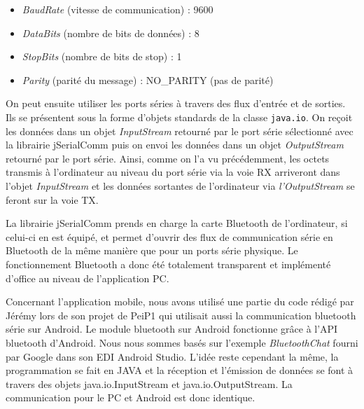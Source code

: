\documentclass{polytech/polytech}
\begin{document}

\begin{itemize}
\item \textit{BaudRate} (vitesse de communication) : 9600
\item \textit{DataBits} (nombre de bits de données) : 8
\item \textit{StopBits} (nombre de bits de stop) : 1
\item \textit{Parity} (parité du message) : NO\_PARITY (pas de parité)
\end{itemize}

On peut ensuite utiliser les ports séries à travers des flux d'entrée et de sorties. Ils se présentent sous la forme d'objets standards de la classe \texttt{java.io}. On reçoit les données dans un objet \textit{InputStream} retourné par le port série sélectionné avec la librairie jSerialComm puis on envoi les données dans un objet \textit{OutputStream} retourné par le port série. Ainsi, comme on l'a vu précédemment, les octets transmis à l'ordinateur au niveau du port série via la voie RX arriveront dans l'objet \textit{InputStream} et les données sortantes de l'ordinateur via \textit{l'OutputStream} se feront sur la voie TX.

La librairie jSerialComm prends en charge la carte Bluetooth de l'ordinateur, si celui-ci en est équipé, et permet d'ouvrir des flux de communication série en Bluetooth de la même manière que pour un ports série physique. Le fonctionnement Bluetooth a donc été totalement transparent et implémenté d'office au niveau de l'application PC.

Concernant l'application mobile, nous avons utilisé une partie du code rédigé par Jérémy lors de son projet de PeiP1 qui utilisait aussi la communication bluetooth série sur Android.
 Le module bluetooth sur Android fonctionne grâce à l'API bluetooth   d'Android. 
Nous nous sommes basés sur l'exemple \textit{BluetoothChat} fourni par Google dans son EDI Android Studio. L'idée reste cependant la même, la programmation se fait en JAVA et la réception et l'émission de données se font à travers des objets java.io.InputStream et java.io.OutputStream. 
La communication pour le PC et Android est donc identique.

\end{document}
